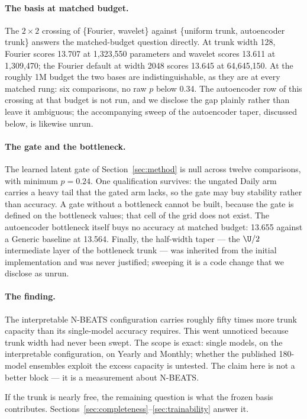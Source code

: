 \paragraph{The basis at matched budget.} The $2 \times 2$ crossing of \{Fourier, wavelet\}
against \{uniform trunk, autoencoder trunk\} answers the matched-budget question directly. At
trunk width 128, Fourier scores 13.707 at 1,323,550 parameters and wavelet scores 13.611 at
1,309,470; the Fourier default at width 2048 scores 13.645 at 64,645,150. At the roughly 1M
budget the two bases are indistinguishable, as they are at every matched rung: six comparisons,
no raw $p$ below 0.34. The autoencoder row of this crossing at that budget is not run, and we
disclose the gap plainly rather than leave it ambiguous; the accompanying sweep of the
autoencoder taper, discussed below, is likewise unrun.

\paragraph{The gate and the bottleneck.} The learned latent gate of
Section~\ref{sec:method} is null across twelve comparisons, with minimum $p = 0.24$. One
qualification survives: the ungated Daily arm carries a heavy tail that the gated arm lacks, so
the gate may buy stability rather than accuracy. A gate without a bottleneck cannot be built,
because the gate is defined on the bottleneck values; that cell of the grid does not exist. The
autoencoder bottleneck itself buys no accuracy at matched budget: 13.655 against a Generic
baseline at 13.564. Finally, the half-width taper --- the $\U/2$ intermediate layer of the
bottleneck trunk --- was inherited from the initial implementation and was never justified;
sweeping it is a code change that we disclose as unrun.

\paragraph{The finding.} The interpretable N-BEATS configuration carries roughly fifty times
more trunk capacity than its single-model accuracy requires. This went unnoticed because trunk
width had never been swept. The scope is exact: single models, on the interpretable
configuration, on Yearly and Monthly; whether the published 180-model ensembles exploit the
excess capacity is untested. The claim here is not a better block --- it is a measurement about
N-BEATS.

If the trunk is nearly free, the remaining question is what the frozen basis contributes.
Sections~\ref{sec:completeness}--\ref{sec:trainability} answer it.
